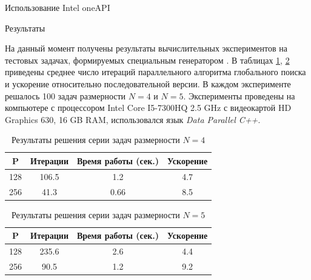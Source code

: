 \documentclass{beamer}
\begin{document}
\begin{frame}[t]
\begin{columns}[t]
\begin{column}[t]{0.47\paperwidth}
\begin{block}{Использование Intel oneAPI}
\end{block}

\begin{block}{Результаты}

\leftskip=0.5cm \rightskip=0.5cm 
\setlength{\parindent}{1.25cm} %
На данный момент получены результаты вычислительных экспериментов на тестовых задачах, формируемых специальным генератором \cite{GKLS}. В таблицах \ref{table:GKLS_RES_1}, \ref{table:GKLS_RES_2} приведены среднее число итераций параллельного алгоритма глобального поиска и ускорение относительно последовательной версии. В каждом эксперименте решалось 100 задач размерности \(N = 4\) и \(N = 5\). Эксперименты проведены на компьютере с процессором Intel Core I5-7300HQ 2.5 GHz с видеокартой HD Graphics 630, 16 GB RAM, использовался язык \textit{Data Parallel C++}.



\begin{table}[!hbp]
    \centering
    \caption{Результаты решения серии задач размерности $N=4$}
     \renewcommand{\arraystretch}{1.4}
    \renewcommand{\tabcolsep}{1cm}
    \begin{tabular}{|c|c|c|c|}
    \hline
    P  & Итерации  & Время работы (сек.) & Ускорение \\ \hline
	128 & 106.5 & 1.2  & 4.7    \\ \hline
	256 & 41.3 & 0.66   & 8.5          \\ \hline
	\end{tabular}
    
    \label{table:GKLS_RES_1}
\end{table}

\begin{table}[!hbp]
    \centering
    \caption{Результаты решения серии задач размерности $N=5$}
    \renewcommand{\arraystretch}{1.4}
    \renewcommand{\tabcolsep}{1cm}
    \begin{tabular}{|c|c|c|c|}
    \hline
    P  & Итерации  & Время работы (сек.) & Ускорение \\ \hline
	128 &        235.6 & 2.6  & 4.4      \\ \hline
	256 &       90.5  & 1.2 & 9.2      \\ \hline
	\end{tabular}
    
    \label{table:GKLS_RES_2}
\end{table}


\end{block}
\end{column}
\end{columns}
\end{frame}
\end{document}
